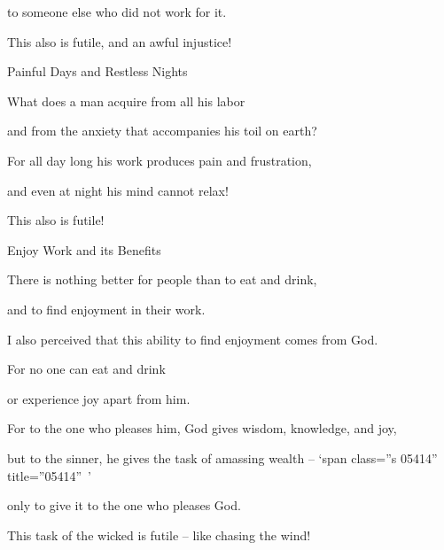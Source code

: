 {\par }{\Q to someone
else who did not
work for it.
\par }{\Q This
also
is futile,
and an awful
injustice!
\par }{\SH Painful Days and Restless Nights
\par }{\Q {}What
does a man
acquire
from all
his labor
\par }{\Q and from the anxiety
that accompanies
his
toil
on earth?
\par }{\Q {}For
all
day
long his work produces pain
and frustration,
\par }{\Q and even
at night
his mind
cannot relax!

\par }{\Q This
also
is futile!
\par }{\SH Enjoy Work and its Benefits
\par }{\Q {}There is nothing
better
for people
than
to eat
and drink,
\par }{\Q and to find enjoyment
in their work.
\par }{\Q I also
perceived
that
this ability
to find enjoyment comes from
God.
\par }{\Q {}For
no one can
eat
and drink
\par }{\Q or experience
joy apart
from him.
\par }{\Q {}For
to the one
who pleases
him, God gives
wisdom,
knowledge,
and joy,
\par }{\Q but to the sinner,
he gives
the task
of amassing wealth – ‘span class=”s 05414” title=”05414” ’
\par }{\Q only to give
it to the one who pleases
God.
\par }{\PP \par }{\Q This
task of the wicked is futile
– like chasing
the wind!

}
